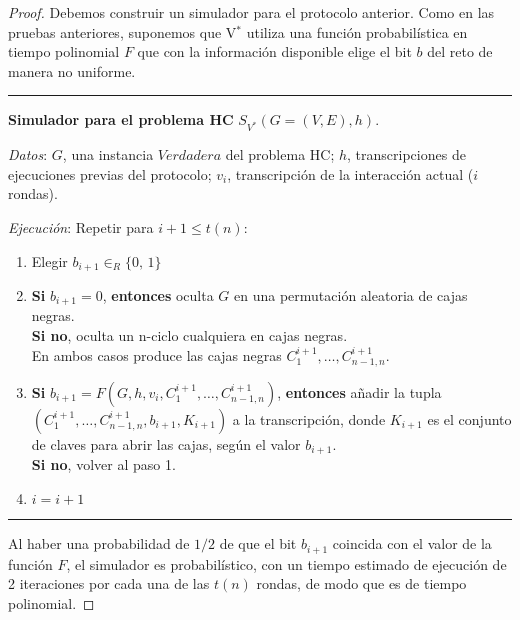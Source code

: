 \begin{proof}
	Debemos construir un simulador para el protocolo anterior. Como en las pruebas anteriores, suponemos que V$^*$ utiliza una función probabilística en tiempo polinomial $F$ que con la información disponible elige el bit $b$ del reto de manera no uniforme.
	
	\hfil 
	
	\rule{\textwidth}{1pt}
	
	\textbf{Simulador para el problema HC} $S_{V^*}(G=(V,E), h)$.
	
	\hfil
	
	\textit{Datos}: \quad $G$, una instancia $Verdadera$ del problema HC; $h$, transcripciones de ejecuciones previas del protocolo; $v_i$, transcripción de la interacción actual ($i$ rondas).
	
	\textit{Ejecución}: Repetir para $i+1 \leq t(n)$:
	
	\begin{enumerate}
		\item Elegir $b_{i+1} \in_R \{0,\,1\}$
		
		\item \textbf{Si} $b_{i+1} = 0$, \textbf{entonces} oculta $G$ en una permutación aleatoria de cajas negras. \\
		\textbf{Si no}, oculta un n-ciclo cualquiera en cajas negras.\\
		En ambos casos produce las cajas negras $C_1^{i+1}, \dots, C_{n-1,n}^{i+1}$.\\
		
		\item \textbf{Si} $b_{i+1} = F(G,h,v_i,C_1^{i+1}, \dots, C_{n-1,n}^{i+1})$, \textbf{entonces} añadir la tupla \\ $(C_1^{i+1}, \dots, C_{n-1,n}^{i+1},b_{i+1},K_{i+1})$ a la transcripción, donde $K_{i+1}$ es el conjunto de claves para abrir las cajas, según el valor $b_{i+1}$. \\
		\textbf{Si no}, volver al paso 1.
		
		\item $i = i+1$
		
	\end{enumerate}
	
	\rule{\textwidth}{1pt}
	
	\hfill
	
	Al haber una probabilidad de $1/2$ de que el bit $b_{i+1}$ coincida con el valor de la función $F$, el simulador es probabilístico, con un tiempo estimado de ejecución de 2 iteraciones por cada una de las $t(n)$ rondas, de modo que es de tiempo polinomial.
	

\end{proof}

